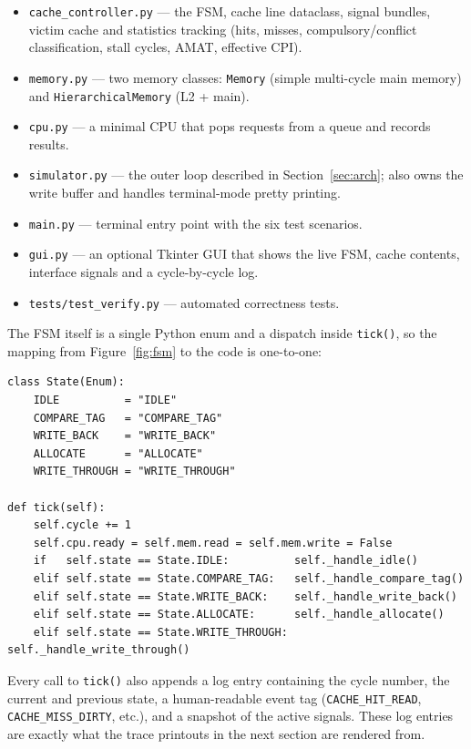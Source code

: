 \documentclass[11pt,a4paper]{article}
\begin{document}
\begin{itemize}[leftmargin=1.4em,itemsep=0.1em]
    \item \texttt{cache\_controller.py} — the FSM, cache line dataclass,
    signal bundles, victim cache and statistics tracking (hits, misses,
    compulsory/conflict classification, stall cycles, AMAT, effective CPI).
    \item \texttt{memory.py} — two memory classes: \texttt{Memory} (simple
    multi-cycle main memory) and \texttt{HierarchicalMemory} (L2 + main).
    \item \texttt{cpu.py} — a minimal CPU that pops requests from a queue
    and records results.
    \item \texttt{simulator.py} — the outer loop described in
    Section~\ref{sec:arch}; also owns the write buffer and handles
    terminal-mode pretty printing.
    \item \texttt{main.py} — terminal entry point with the six test scenarios.
    \item \texttt{gui.py} — an optional Tkinter GUI that shows the live FSM,
    cache contents, interface signals and a cycle-by-cycle log.
    \item \texttt{tests/test\_verify.py} — automated correctness tests.
\end{itemize}

The FSM itself is a single Python enum and a dispatch inside \texttt{tick()},
so the mapping from Figure~\ref{fig:fsm} to the code is one-to-one:

\begin{lstlisting}
class State(Enum):
    IDLE          = "IDLE"
    COMPARE_TAG   = "COMPARE_TAG"
    WRITE_BACK    = "WRITE_BACK"
    ALLOCATE      = "ALLOCATE"
    WRITE_THROUGH = "WRITE_THROUGH"

def tick(self):
    self.cycle += 1
    self.cpu.ready = self.mem.read = self.mem.write = False
    if   self.state == State.IDLE:          self._handle_idle()
    elif self.state == State.COMPARE_TAG:   self._handle_compare_tag()
    elif self.state == State.WRITE_BACK:    self._handle_write_back()
    elif self.state == State.ALLOCATE:      self._handle_allocate()
    elif self.state == State.WRITE_THROUGH: self._handle_write_through()
\end{lstlisting}

Every call to \texttt{tick()} also appends a log entry containing the cycle
number, the current and previous state, a human-readable event tag
(\texttt{CACHE\_HIT\_READ}, \texttt{CACHE\_MISS\_DIRTY}, etc.), and a snapshot
of the active signals. These log entries are exactly what the trace printouts
in the next section are rendered from.
\end{document}
